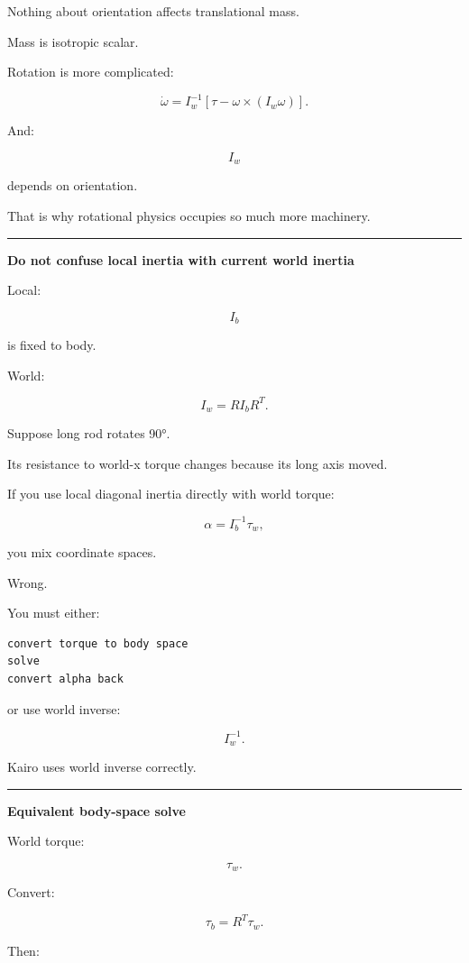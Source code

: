 Nothing about orientation affects translational mass.

Mass is isotropic scalar.

Rotation is more complicated:

\[
\dot\omega
=
I_w^{-1}
[
\tau-\omega\times(I_w\omega)
].
\]

And:

\[
I_w
\]

depends on orientation.

That is why rotational physics occupies so much more machinery.

\begin{center}\rule{0.5\linewidth}{0.5pt}\end{center}

\textbf{Do not confuse local inertia with current world inertia}

Local:

\[
I_b
\]

is fixed to body.

World:

\[
I_w=RI_bR^T.
\]

Suppose long rod rotates 90°.

Its resistance to world-x torque changes because its long axis moved.

If you use local diagonal inertia directly with world torque:

\[
\alpha=
I_b^{-1}\tau_w,
\]

you mix coordinate spaces.

Wrong.

You must either:

\begin{verbatim}
convert torque to body space
solve
convert alpha back
\end{verbatim}

or use world inverse:

\[
I_w^{-1}.
\]

Kairo uses world inverse correctly.

\begin{center}\rule{0.5\linewidth}{0.5pt}\end{center}

\textbf{Equivalent body-space solve}

World torque:

\[
\tau_w.
\]

Convert:

\[
\tau_b=R^T\tau_w.
\]

Then:

